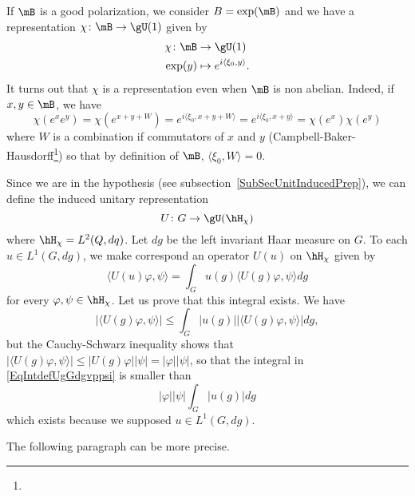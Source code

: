 If $\mB$ is a good polarization, we consider $B=\exp(\mB)$ and we have a representation $\chi\colon \mB\to \gU(1)$ given by
\begin{equation}
	\begin{aligned}
		\chi\colon \mB & \to \gU(1)                              \\
		\exp(y)        & \mapsto  e^{i\langle \xi_0, y\rangle }.
	\end{aligned}
\end{equation}
It turns out that $\chi$ is a representation even when $\mB$ is non abelian. Indeed, if $x,y\in\mB$, we have
\begin{equation}
	\chi( e^{x} e^{y})=\chi( e^{x+y+W})= e^{i\langle \xi_0, x+y+W\rangle }= e^{i\langle \xi_0, x+y\rangle }= \chi( e^{x})\chi( e^{y})
\end{equation}
where $W$ is a combination if commutators of $x$ and $y$ (Campbell-Baker-Hausdorff\footnote{}) so that by definition of $\mB$, $\langle \xi_0, W\rangle =0$.

Since we are in the hypothesis (see subsection~\ref{SubSecUnitInducedPrep}), we can define the induced unitary representation
\begin{equation}
	U\colon G\to \gU(\hH_{\chi})
\end{equation}
where $\hH_{\chi}=L^2(Q,dq)$. Let $dg$ be the left invariant Haar measure on $G$.  To each $u\in L^1(G,dg)$, we make correspond an operator $U(u)$ on $\hH_{\chi}$ given by
\begin{equation}	\label{EqDefUudansHh}
	\langle U(u)\varphi, \psi\rangle =\int_Gu(g)\langle U(g)\varphi, \psi\rangle dg
\end{equation}
for every $\varphi,\psi\in\hH_{\chi}$. Let us prove that this integral exists. We have
\begin{equation}	\label{EqIntdefUgGdgvppsi}
	| \langle U(g)\varphi, \psi\rangle  |\leq\int_G| u(g) | |\langle U(g)\varphi, \psi\rangle  |dg,
\end{equation}
but the Cauchy-Schwarz inequality shows that $| \langle U(g)\varphi, \psi\rangle  |\leq| U(g)\varphi | |\psi |=| \varphi | |\psi |$, so that the integral in \eqref{EqIntdefUgGdgvppsi} is smaller than
\begin{equation}
	| \varphi | | \psi |  \int_G| u(g) |dg
\end{equation}
which exists because we supposed $u\in L^1(G,dg)$.

\begin{probleme}
	The following paragraph can be more precise.
\end{probleme}

